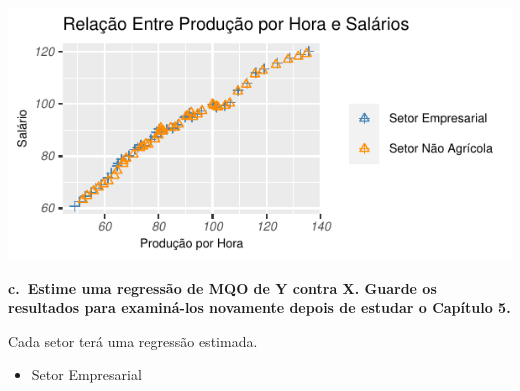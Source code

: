 \documentclass[
  11pt,
  a4paper,
]{article}
\providecommand{\tightlist}{%
  \setlength{\itemsep}{0pt}\setlength{\parskip}{0pt}}
\begin{document}
\begin{center}\includegraphics{article_files/figure-latex/unnamed-chunk-24-1} \end{center}

\textbf{c.~Estime uma regressão de MQO de Y contra X. Guarde os resultados para examiná-los novamente depois de estudar o Capítulo 5.}

Cada setor terá uma regressão estimada.

\begin{itemize}
\tightlist
\item
  Setor Empresarial
\end{itemize}
\end{document}
